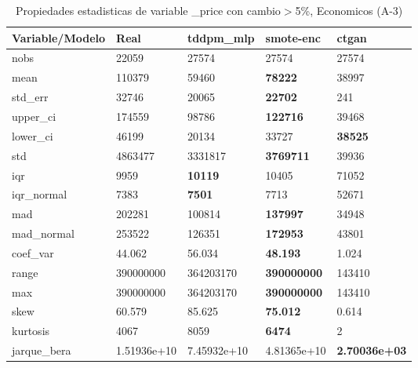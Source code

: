 \begin{table}[H]
\centering
\fontsize{8}{14}\selectfont
\caption{Propiedades estadisticas de variable \_price con cambio\ensuremath{>}5\%, Economicos (A-3)}
\label{table-stats-economicos-a-3-_price-short}
\begin{tabular}{|l|m{10em}|m{10em}|m{10em}|m{10em}|}
\hline
 \rowcolor[gray]{0.8}
Variable/Modelo & Real & tddpm\_mlp & smote-enc & ctgan \\
\hline nobs & 22059 & 27574 & 27574 & 27574 \\
\hline mean & 110379 & 59460 & \bfseries 78222 & \cellcolor[rgb]{0.9, 0.54, 0.52} 38997 \\
\hline std\_err & 32746 & 20065 & \bfseries 22702 & \cellcolor[rgb]{0.9, 0.54, 0.52} 241 \\
\hline upper\_ci & 174559 & 98786 & \bfseries 122716 & \cellcolor[rgb]{0.9, 0.54, 0.52} 39468 \\
\hline lower\_ci & 46199 & \cellcolor[rgb]{0.9, 0.54, 0.52} 20134 & 33727 & \bfseries 38525 \\
\hline std & 4863477 & 3331817 & \bfseries 3769711 & \cellcolor[rgb]{0.9, 0.54, 0.52} 39936 \\
\hline iqr & 9959 & \bfseries 10119 & 10405 & \cellcolor[rgb]{0.9, 0.54, 0.52} 71052 \\
\hline iqr\_normal & 7383 & \bfseries 7501 & 7713 & \cellcolor[rgb]{0.9, 0.54, 0.52} 52671 \\
\hline mad & 202281 & 100814 & \bfseries 137997 & \cellcolor[rgb]{0.9, 0.54, 0.52} 34948 \\
\hline mad\_normal & 253522 & 126351 & \bfseries 172953 & \cellcolor[rgb]{0.9, 0.54, 0.52} 43801 \\
\hline coef\_var & 44.062 & 56.034 & \bfseries 48.193 & \cellcolor[rgb]{0.9, 0.54, 0.52} 1.024 \\
\hline range & 390000000 & 364203170 & \bfseries 390000000 & \cellcolor[rgb]{0.9, 0.54, 0.52} 143410 \\
\hline max & 390000000 & 364203170 & \bfseries 390000000 & \cellcolor[rgb]{0.9, 0.54, 0.52} 143410 \\
\hline skew & 60.579 & 85.625 & \bfseries 75.012 & \cellcolor[rgb]{0.9, 0.54, 0.52} 0.614 \\
\hline kurtosis & 4067 & 8059 & \bfseries 6474 & \cellcolor[rgb]{0.9, 0.54, 0.52} 2 \\
\hline jarque\_bera & 1.51936e+10 & \cellcolor[rgb]{0.9, 0.54, 0.52} 7.45932e+10 & 4.81365e+10 & \bfseries 2.70036e+03 \\

\end{tabular}
\end{table}
